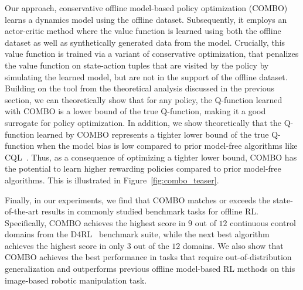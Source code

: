 \documentclass[../thesis.tex]{subfiles}
\begin{document}
Our approach, conservative offline model-based policy optimization (COMBO) learns a dynamics model using the offline dataset. Subsequently, it employs an actor-critic method where the value function is learned using both the offline dataset as well as synthetically generated data from the model. Crucially, this value function is trained via a variant of conservative optimization, that penalizes the value function on state-action tuples that are visited by the policy by simulating the learned model, but are not in the support of the offline dataset.
Building on the tool from the theoretical analysis discussed in the previous section, we can theoretically show that for any policy, the Q-function learned with COMBO is a lower bound of the true Q-function, making it a good surrogate for policy optimization.
In addition, we show theoretically that the Q-function learned by COMBO represents a tighter lower bound of the true Q-function when the model bias is low compared to prior model-free algorithms like CQL~\cite{kumar2020conservative}.
Thus, as a consequence of optimizing a tighter lower bound, COMBO has the potential to learn higher rewarding policies compared to prior model-free algorithms. This is illustrated in Figure~\ref{fig:combo_teaser}.

Finally, in our experiments, we find that COMBO matches or exceeds the state-of-the-art results in commonly studied benchmark tasks for offline RL. Specifically, COMBO achieves the highest score in $9$ out of $12$ continuous control domains from the D4RL~\cite{fu2020d4rl} benchmark suite, while the next best algorithm achieves the highest score in only $3$ out of the $12$ domains. We also show that COMBO achieves the best performance in tasks that require out-of-distribution generalization and outperforms previous offline model-based RL methods on this image-based robotic manipulation task.%
\end{document}
